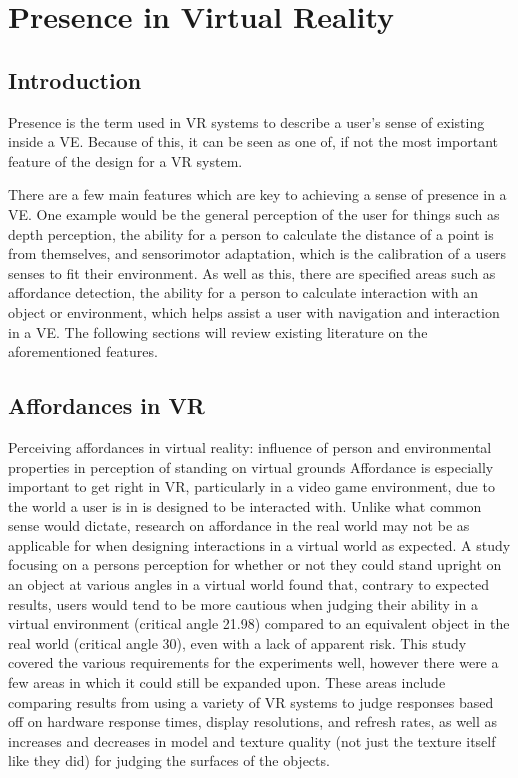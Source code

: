 \section{Presence in Virtual Reality}
\label{lr:vr}

	
	\subsection{Introduction}
	\label{lr:vr:intro}
		Presence is the term used in VR systems to describe a user's sense of existing inside a VE. Because of this, it can be seen as one of, if not the most important feature of the design for a VR system.
		
		There are a few main features which are key to achieving a sense of presence in a VE. One example would be the general perception of the user for things such as depth perception, the ability for a person to calculate the distance of a point is from themselves, and sensorimotor adaptation, which is the calibration of a users senses to fit their environment. 
		As well as this, there are specified areas such as affordance detection, the ability for a person to calculate interaction with an object or environment, which helps assist a user with navigation and interaction in a VE. 
		The following sections will review existing literature on the aforementioned features.
	
	\subsection{Affordances in VR}
	\label{lr:vr:affordances}
		Perceiving affordances in virtual reality: influence of person and environmental properties in perception of standing on virtual grounds
		Affordance is especially important to get right in VR, particularly in a video game environment, due to the world a user is in is designed to be interacted with. Unlike what common sense would dictate, research on affordance in the real world may not be as applicable for when designing interactions in a virtual world as expected. A study \cite{Regia-Corte2012} focusing on a persons perception for whether or not they could stand upright on an object at various angles in a virtual world found that, contrary to expected results, users would tend to be more cautious when judging their ability in a virtual environment (critical angle 21.98\degree) compared to an equivalent object in the real world (critical angle 30\degree), even with a lack of apparent risk. 
		This study covered the various requirements for the experiments well, however there were a few areas in which it could still be expanded upon. These areas include comparing results from using a variety of VR systems to judge responses based off on hardware response times, display resolutions, and refresh rates, as well as increases and decreases in model and texture quality (not just the texture itself like they did) for judging the surfaces of the objects.
		
